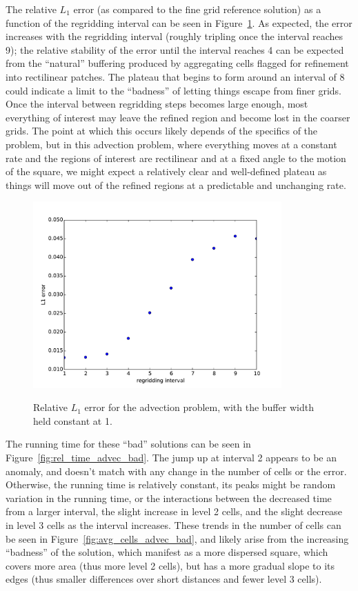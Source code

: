 \documentclass[11pt]{article}
\begin{document}
The relative $L_1$ error (as compared to the fine grid reference solution)
as a function of the regridding interval can be seen in 
Figure~\ref{fig:err_advec_bad}. As expected, the error increases with the
regridding interval (roughly tripling once the interval reaches 9); the 
relative stability of the error until the interval reaches 4 can be expected
from the ``natural'' buffering produced by aggregating cells flagged for 
refinement into rectilinear patches. 
The plateau that begins to form around an interval of 8 could indicate a limit
to the ``badness'' of letting things escape from finer grids. Once the interval
between regridding steps becomes large enough, most everything of interest
may leave the refined region and become lost in the coarser grids. The point
at which this occurs likely depends of the specifics of the problem, but in
this advection problem, where everything moves at a constant rate and the 
regions of interest are rectilinear and at a fixed angle to the motion of
the square, we might expect a relatively clear and well-defined plateau
as things will move out of the refined regions at a predictable and
unchanging rate.

\begin{figure}[!htb]
\centering
\caption{Relative $L_1$ error for the advection problem, with the buffer
width held constant at 1.}
\includegraphics[width=0.85\textwidth]{myclaw/l1_err_advec_bad}
\label{fig:err_advec_bad}
\end{figure}

The running time for these ``bad'' solutions can be seen in 
Figure~\ref{fig:rel_time_advec_bad}. The jump up at interval 2 appears
to be an anomaly, and doesn't match with any change in the number of
cells or the error. Otherwise, the running time is relatively constant,
its peaks might be random variation in the running time, or the interactions
between the decreased time from a larger interval, the slight increase in
level 2 cells, and the slight decrease in level 3 cells as the interval
increases. These trends in the number of cells can be seen in 
Figure~\ref{fig:avg_cells_advec_bad}, and likely arise from the increasing
``badness'' of the solution, which manifest as a more dispersed square,
which covers more area (thus more level 2 cells), but has a more gradual
slope to its edges (thus smaller differences over short distances and
fewer level 3 cells).
\end{document}
